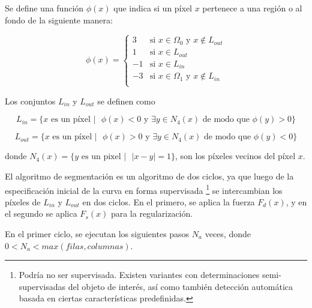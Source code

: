 \documentclass[a4paper,10pt]{article}
\begin{document}
Se define una función $\phi(x)$ que indica si un píxel $x$ pertenece a una región o al fondo de la siguiente manera:

\begin{equation}
\phi(x) =
\left\{
    \begin{array}{ll}
        3  & \mbox{si } x \in \Omega_{0} \mbox{  y  } x \notin L_{out} \\
        1  & \mbox{si } x \in L_{out}\\
        -1  & \mbox{si } x \in L_{in}\\
        -3 & \mbox{si } x \in \Omega_{1} \mbox{  y  } x \notin L_{in} \\
    \end{array}
\right.
\end{equation}

Los conjuntos $L_{in}$ y $L_{out}$ se definen como

\begin{equation}
    L_{in} = \{ x \mbox{ es un píxel } \vert \mbox{    }  \phi(x) < 0 \mbox{ y } \exists y \in N_{4}(x) \mbox{ de modo que } \phi(y) > 0 \}
\end{equation}

\begin{equation}
    L_{out} = \{ x \mbox{ es un píxel } \vert \mbox{    } \phi(x) > 0 \mbox{ y } \exists y \in N_{4}(x) \mbox{ de modo que } \phi(y) < 0 \}
\end{equation}

donde $N_{4}(x) = \{ y \mbox{ es un pixel } \vert \mbox{   } |x-y| = 1 \}$, son los píxeles
vecinos del píxel $x$.

El algoritmo de segmentación es un algoritmo de dos ciclos, ya que luego de la
especificación inicial de la curva en forma supervisada \footnote{Podría no ser
supervisada. Existen variantes con determinaciones semi-supervisadas del objeto
de interés, así como también detección automática basada en ciertas
características predefinidas.} se intercambian los píxeles de $L_{in}$ y
$L_{out}$ en dos ciclos. En el primero, se aplica la fuerza $F_{d}(x)$, y en el
segundo se aplica $F_{s}(x)$ para la regularización.

En el primer ciclo, se ejecutan los siguientes pasos $N_{a}$ veces, donde $ 0 <
N_{a} < max(filas, columnas)$.
\end{document}

